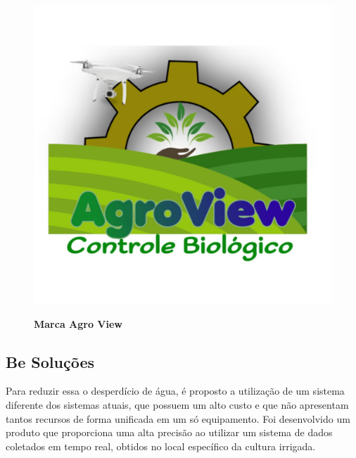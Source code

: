\begin{figure}[!htb]
\centering
\caption{\textbf{Marca Agro View}}
\includegraphics[scale=0.2]{Imagens/agroview.jpg}
\label{figura_19}
\end{figure}

\subsection{Be Soluções}

Para reduzir essa o desperdício de água, é proposto a utilização de um sistema diferente dos sistemas atuais, que possuem um alto custo e que não apresentam tantos recursos de forma unificada em um só equipamento. Foi desenvolvido um produto que proporciona uma alta precisão ao utilizar um sistema de dados coletados em tempo real, obtidos no local específico da cultura irrigada.

